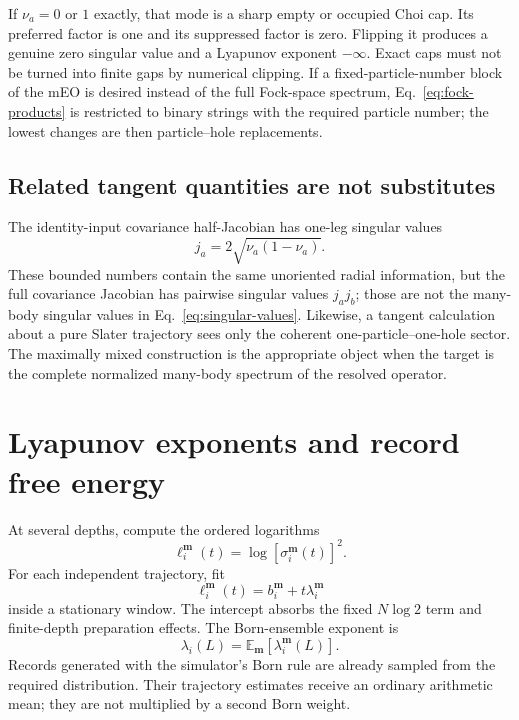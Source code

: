 \documentclass[aps,prb,twocolumn,floatfix,nofootinbib,superscriptaddress]{revtex4-2}
\newcommand{\E}{\mathbb{E}}
\begin{document}
If \(\nu_a=0\) or \(1\) exactly, that mode is a sharp empty or occupied Choi cap.  Its preferred factor is one and its suppressed factor is zero.  Flipping it produces a genuine zero singular value and a Lyapunov exponent \(-\infty\).  Exact caps must not be turned into finite gaps by numerical clipping.  If a fixed-particle-number block of the mEO is desired instead of the full Fock-space spectrum, Eq.~\eqref{eq:fock-products} is restricted to binary strings with the required particle number; the lowest changes are then particle--hole replacements.

\subsection{Related tangent quantities are not substitutes}

The identity-input covariance half-Jacobian has one-leg singular values
\begin{equation}
 j_a=2\sqrt{\nu_a(1-\nu_a)}.
 \label{eq:half-jacobian}
\end{equation}
These bounded numbers contain the same unoriented radial information, but the full covariance Jacobian has pairwise singular values \(j_aj_b\); those are not the many-body singular values in Eq.~\eqref{eq:singular-values}.  Likewise, a tangent calculation about a pure Slater trajectory sees only the coherent one-particle--one-hole sector.  The maximally mixed construction is the appropriate object when the target is the complete normalized many-body spectrum of the resolved operator.

\section{Lyapunov exponents and record free energy}

At several depths, compute the ordered logarithms
\begin{equation}
 \ell_i^{\boldsymbol m}(t)=\log[\sigma_i^{\boldsymbol m}(t)]^2.
 \label{eq:ell}
\end{equation}
For each independent trajectory, fit
\begin{equation}
 \ell_i^{\boldsymbol m}(t)=b_i^{\boldsymbol m}+t\lambda_i^{\boldsymbol m}
 \label{eq:trajectory-fit}
\end{equation}
inside a stationary window.  The intercept absorbs the fixed \(N\log2\) term and finite-depth preparation effects.  The Born-ensemble exponent is
\begin{equation}
 \lambda_i(L)=\E_{\boldsymbol m}\!\left[\lambda_i^{\boldsymbol m}(L)\right].
 \label{eq:born-average}
\end{equation}
Records generated with the simulator's Born rule are already sampled from the required distribution.  Their trajectory estimates receive an ordinary arithmetic mean; they are not multiplied by a second Born weight.
\end{document}
